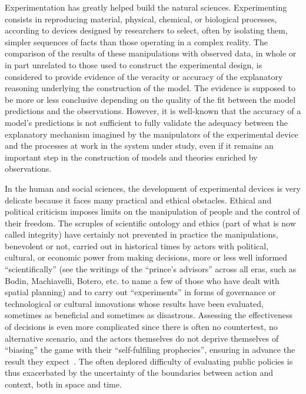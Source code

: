 \documentclass[10pt]{article}
\begin{document}
Experimentation has greatly helped build the natural sciences. Experimenting consists in reproducing material, physical, chemical, or biological processes, according to devices designed by researchers to select, often by isolating them, simpler sequences of facts than those operating in a complex reality. The comparison of the results of these manipulations with observed data, in whole or in part unrelated to those used to construct the experimental design, is considered to provide evidence of the veracity or accuracy of the explanatory reasoning underlying the construction of the model. The evidence is supposed to be more or less conclusive depending on the quality of the fit between the model predictions and the observations. However, it is well-known that the accuracy of a model’s predictions is not sufficient to fully validate the adequacy between the explanatory mechanism imagined by the manipulators of the experimental device and the processes at work in the system under study, even if it remains an important step in the construction of models and theories enriched by observations.


In the human and social sciences, the development of experimental devices is very delicate because it faces many practical and ethical obstacles. Ethical and political criticism imposes limits on the manipulation of people and the control of their freedom. The scruples of scientific ontology and ethics (part of what is now called integrity) have certainly not prevented in practice the manipulations, benevolent or not, carried out in historical times by actors with political, cultural, or economic power from making decisions, more or less well informed “scientifically” (see the writings of the “prince’s advisors” across all eras, such as Bodin, Machiavelli, Botero, etc. to name a few of those who have dealt with spatial planning) and to carry out ``experiments'' in forms of governance or technological or cultural innovations whose results have been evaluated, sometimes as beneficial and sometimes as disastrous. Assessing the effectiveness of decisions is even more complicated since there is often no countertest, no alternative scenario, and the actors themselves do not deprive themselves of ``biasing'' the game with their ``self-fulfiling prophecies'', ensuring in advance the result they expect~\citep{rist1970student}. The often deplored difficulty of evaluating public policies is thus exacerbated by the uncertainty of the boundaries between action and context, both in space and time.
\end{document}
